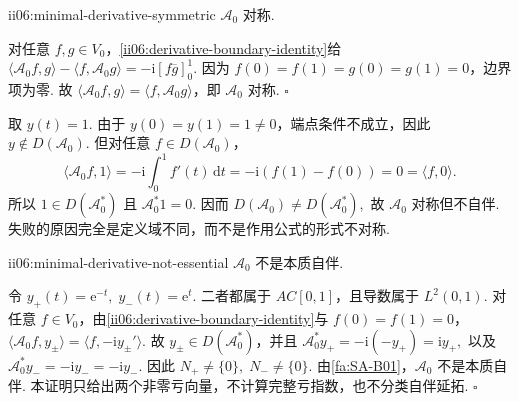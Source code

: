\begin{FAProposition}[B][最小一阶微分算子对称]{ii06:minimal-derivative-symmetric}
\(\displaystyle\mathcal A_0\) 对称.
\end{FAProposition}

\begin{FAProof}
对任意 \(\displaystyle f,g\in V_0\)，\autoref{ii06:derivative-boundary-identity}给
\(\displaystyle \langle\mathcal A_0f,g\rangle - \langle f,\mathcal A_0g\rangle = -\mathrm{i}\left[f\overline g\right]_0^1.\)
因为 \(\displaystyle f(0)=f(1)=g(0)=g(1)=0\)，边界项为零. 故 \(\displaystyle\langle\mathcal A_0f,g\rangle=\langle f,\mathcal A_0g\rangle\)，即 \(\displaystyle\mathcal A_0\) 对称.
\hfill\(\square\)
\end{FAProof}

\begin{FACounterexample}[对称不蕴含自伴]
取 \(\displaystyle y(t)=1\). 由于 \(\displaystyle y(0)=y(1)=1\neq0\)，端点条件不成立，因此 \(\displaystyle y\notin D(\mathcal A_0)\). 但对任意 \(\displaystyle f\in D(\mathcal A_0)\)，
\[
\langle\mathcal A_0f,1\rangle
=
-\mathrm{i}\int_0^1f'(t)\,\mathrm{d}t
=
-\mathrm{i}(f(1)-f(0))
=
0
=
\langle f,0\rangle.
\]
所以 \(\displaystyle1\in D(\mathcal A_0^*)\) 且 \(\displaystyle\mathcal A_0^*1=0\). 因而
\(\displaystyle D(\mathcal A_0) \neq D(\mathcal A_0^*),\)
故 \(\displaystyle\mathcal A_0\) 对称但不自伴. 失败的原因完全是定义域不同，而不是作用公式的形式不对称.
\end{FACounterexample}

\begin{FAProposition}[B][最小一阶微分算子不是本质自伴]{ii06:minimal-derivative-not-essential}
\(\displaystyle\mathcal A_0\) 不是本质自伴.
\end{FAProposition}

\begin{FAProof}
令
\(\displaystyle y_+(t)=\mathrm{e}^{-t},\; y_-(t)=\mathrm{e}^{t}.\)
二者都属于 \(\displaystyle AC[0,1]\)，且导数属于 \(\displaystyle L^2(0,1)\). 对任意 \(\displaystyle f\in V_0\)，由\autoref{ii06:derivative-boundary-identity}与 \(\displaystyle f(0)=f(1)=0\)，
\(\displaystyle \langle\mathcal A_0f,y_\pm\rangle = \langle f,-\mathrm{i}y_\pm'\rangle.\)
故 \(\displaystyle y_\pm\in D(\mathcal A_0^*)\)，并且
\(\displaystyle \mathcal A_0^*y_+ = -\mathrm{i}(-y_+) = \mathrm{i}y_+,\)
以及
\(\displaystyle \mathcal A_0^*y_- = -\mathrm{i}y_- = -\mathrm{i}y_-.\)
因此
\(\displaystyle N_+\neq\{0\},\; N_-\neq\{0\}.\)
由\autoref{fa:SA-B01}，\(\displaystyle\mathcal A_0\) 不是本质自伴. 本证明只给出两个非零亏向量，不计算完整亏指数，也不分类自伴延拓.
\hfill\(\square\)
\end{FAProof}

